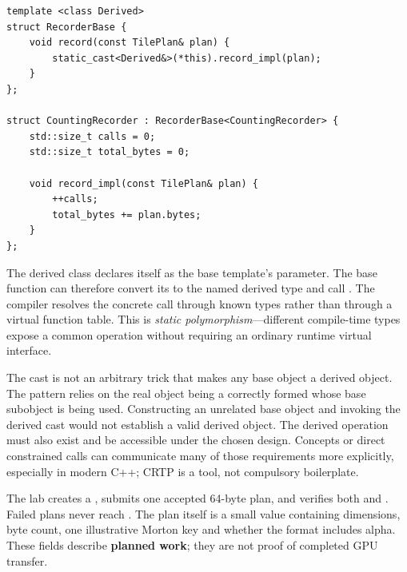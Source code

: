 \begin{verbatim}
template <class Derived>
struct RecorderBase {
    void record(const TilePlan& plan) {
        static_cast<Derived&>(*this).record_impl(plan);
    }
};

struct CountingRecorder : RecorderBase<CountingRecorder> {
    std::size_t calls = 0;
    std::size_t total_bytes = 0;

    void record_impl(const TilePlan& plan) {
        ++calls;
        total_bytes += plan.bytes;
    }
};
\end{verbatim}

The derived class declares itself as the base template's parameter. The base function can therefore convert its  to the named derived type and call . The compiler resolves the concrete call through known types rather than through a virtual function table. This is \emph{static polymorphism}---different compile-time types expose a common operation without requiring an ordinary runtime virtual interface.

The cast is not an arbitrary trick that makes any base object a derived object. The pattern relies on the real object being a correctly formed  whose  base subobject is being used. Constructing an unrelated base object and invoking the derived cast would not establish a valid derived object. The derived operation must also exist and be accessible under the chosen design. Concepts or direct constrained calls can communicate many of those requirements more explicitly, especially in modern C++; CRTP is a tool, not compulsory boilerplate.

The lab creates a , submits one accepted 64-byte plan, and verifies both  and . Failed plans never reach . The plan itself is a small value containing dimensions, byte count, one illustrative Morton key and whether the format includes alpha. These fields describe \textbf{planned work}; they are not proof of completed GPU transfer.

